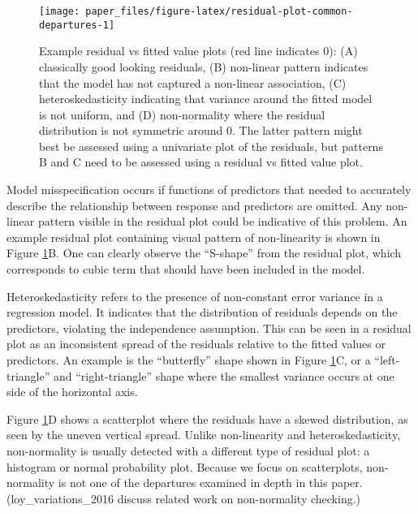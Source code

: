 \documentclass[]{interact}
\theoremstyle{plain}%
\theoremstyle{definition}
\theoremstyle{remark}
\begin{document}
\begin{figure}[t!]

{\centering \texttt{[image: paper\_files/figure-latex/residual-plot-common-departures-1]} 

}

\caption{Example residual vs fitted value plots (red line indicates 0): (A) classically good looking residuals, (B) non-linear pattern indicates that the model has not captured a non-linear association, (C) heteroskedasticity indicating that variance around the fitted model is not uniform, and (D) non-normality where the residual distribution is not symmetric around 0. The latter pattern might best be assessed using a univariate plot of the residuals, but patterns B and C need to be assessed using a residual vs fitted value plot.}\label{fig:residual-plot-common-departures}
\end{figure}

Model misspecification occurs if functions of predictors that needed to
accurately describe the relationship between response and predictors are
omitted. Any non-linear pattern visible in the residual plot could be
indicative of this problem. An example residual plot containing visual
pattern of non-linearity is shown in Figure
\ref{fig:residual-plot-common-departures}B. One can clearly observe the
``S-shape'' from the residual plot, which corresponds to cubic term that
should have been included in the model.

Heteroskedasticity refers to the presence of non-constant error variance
in a regression model. It indicates that the distribution of residuals
depends on the predictors, violating the independence assumption. This
can be seen in a residual plot as an inconsistent spread of the
residuals relative to the fitted values or predictors. An example is the
``butterfly'' shape shown in Figure
\ref{fig:residual-plot-common-departures}C, or a ``left-triangle'' and
``right-triangle'' shape where the smallest variance occurs at one side
of the horizontal axis.

Figure \ref{fig:residual-plot-common-departures}D shows a scatterplot
where the residuals have a skewed distribution, as seen by the uneven
vertical spread. Unlike non-linearity and heteroskedasticity,
non-normality is usually detected with a different type of residual
plot: a histogram or normal probability plot. Because we focus on
scatterplots, non-normality is not one of the departures examined in
depth in this paper. (loy\_variations\_2016 discuss related work on
non-normality checking.)
\end{document}
